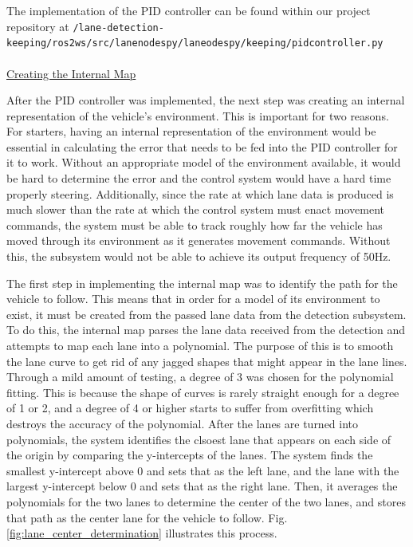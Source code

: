 \documentclass[titlepage]{article}
\begin{document}
{The implementation of the PID controller can be found within our project
repository at \texttt{/lane-detection-keeping/ros2\textunderscore ws/src/lane\textunderscore nodes\textunderscore py/lane\textunderscore odes\textunderscore py/keeping/pid\textunderscore controller.py}\\~\\
\underline{Creating the Internal Map}

After the PID controller was implemented, the next step was creating an internal representation of the vehicle's environment. This is important for two reasons. For starters, having an internal representation of the environment would be essential in calculating the error that needs to be fed into the PID controller for it to work. Without an appropriate model of the environment available, it would be hard to determine the error and the control system would have a hard time properly steering. Additionally, since the rate at which lane data is produced is much slower than the rate at which the control system must enact movement commands, the system must be able to track roughly how far the vehicle has moved through its environment as it generates movement commands. Without this, the subsystem would not be able to achieve its output frequency of 50Hz.

The first step in implementing the internal map was to identify the path for the vehicle to follow. This means that in order for a model of its environment to exist, it must be created from the passed lane data from the detection subsystem. To do this, the internal map parses the lane data received from the detection and attempts to map each lane into a polynomial. The purpose of this is to smooth the lane curve to get rid of any jagged shapes that might appear in the lane lines. Through a mild amount of testing, a degree of 3 was chosen for the polynomial fitting. This is because the shape of curves is rarely straight enough for a degree of 1 or 2, and a degree of 4 or higher starts to suffer from overfitting which destroys the accuracy of the polynomial. After the lanes are turned into polynomials, the system identifies the clsoest lane that appears on each side of the origin by comparing the y-intercepts of the lanes. The system finds the smallest y-intercept above 0 and sets that as the left lane, and the lane with the largest y-intercept below 0 and sets that as the right lane. Then, it averages the polynomials for the two lanes to determine the center of the two lanes, and stores that path as the center lane for the vehicle to follow. Fig. \ref{fig:lane_center_determination} illustrates this process.

}
\end{document}
